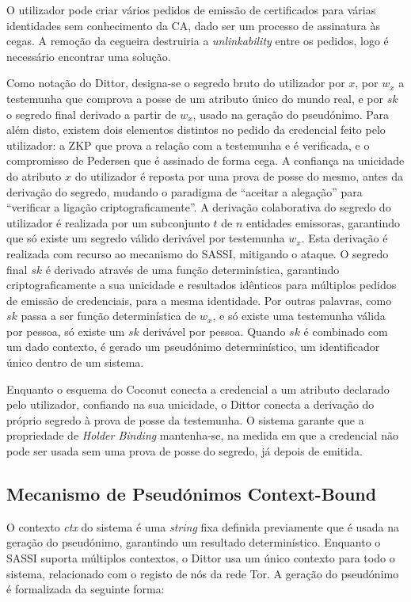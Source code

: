 O utilizador pode criar vários pedidos de emissão de certificados para várias identidades sem conhecimento da CA, dado ser um processo de assinatura às cegas. A remoção da cegueira destruiria a \textit{unlinkability} entre os pedidos, logo é necessário encontrar uma solução.

Como notação do Dittor, designa-se o segredo bruto do utilizador por $x$, por $w_x$ a testemunha que comprova a posse de um atributo único do mundo real, e por $sk$ o segredo final derivado a partir de $w_x$, usado na geração do pseudónimo. Para além disto, existem dois elementos distintos no pedido da credencial feito pelo utilizador: a ZKP que prova a relação com a testemunha e é verificada, e o compromisso de Pedersen que é assinado de forma cega. A confiança na unicidade do atributo $x$ do utilizador é reposta por uma prova de posse do mesmo, antes da derivação do segredo, mudando o paradigma de “aceitar a alegação” para “verificar a ligação criptograficamente”. A derivação colaborativa do segredo do utilizador é realizada por um subconjunto $t$ de $n$ entidades emissoras, garantindo que só existe um segredo válido derivável por testemunha $w_x$. Esta derivação é realizada com recurso ao mecanismo do SASSI, mitigando o ataque. O segredo final $sk$ é derivado através de uma função determinística, garantindo criptograficamente a sua unicidade e resultados idênticos para múltiplos pedidos de emissão de credenciais, para a mesma identidade. Por outras palavras, como $sk$ passa a ser função determinística de $w_x$, e só existe uma testemunha válida por pessoa, só existe um $sk$ derivável por pessoa. Quando $sk$ é combinado com um dado contexto, é gerado um pseudónimo determinístico, um identificador único dentro de um sistema.

Enquanto o esquema do Coconut conecta a credencial a um atributo declarado pelo utilizador, confiando na sua unicidade, o Dittor conecta a derivação do próprio segredo à prova de posse da testemunha. O sistema garante que a propriedade de \textit{Holder Binding} mantenha-se, na medida em que a credencial não pode ser usada sem uma prova de posse do segredo, já depois de emitida.

\subsection{Mecanismo de Pseudónimos Context-Bound}
\label{sub:dittor_pseudonimos_context_bound}

O contexto \textit{ctx} do sistema é uma \textit{string} fixa definida previamente que é usada na geração do pseudónimo, garantindo um resultado determinístico. Enquanto o SASSI suporta múltiplos contextos, o Dittor usa um único contexto para todo o sistema, relacionado com o registo de nós da rede Tor. A geração do pseudónimo é formalizada da seguinte forma:

